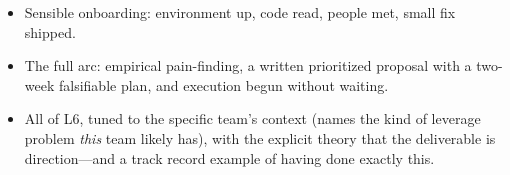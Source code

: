 \begin{interviewq}

\goodgreat
\begin{itemize}
    \item {} Sensible onboarding: environment up, code read, people met, small fix shipped.
    \item {} The full arc: empirical pain-finding, a written prioritized proposal with a two-week falsifiable plan, and execution begun without waiting.
    \item {} All of L6, tuned to the specific team's context (names the kind of leverage problem \textit{this} team likely has), with the explicit theory that the deliverable is direction---and a track record example of having done exactly this.
\end{itemize}

\end{interviewq}


